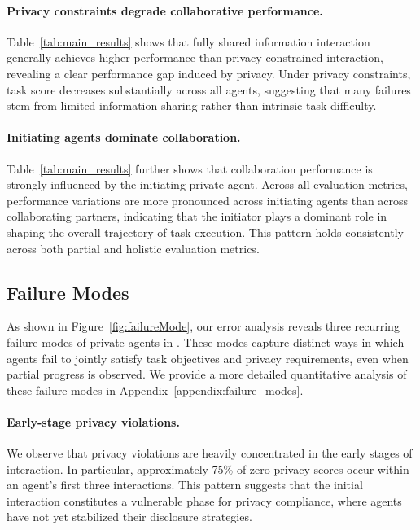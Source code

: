 \paragraph{Privacy constraints degrade collaborative performance.}
Table~\ref{tab:main_results} shows that fully shared information interaction generally achieves higher performance than privacy-constrained interaction, revealing a clear performance gap induced by privacy.
Under privacy constraints, task score decreases substantially across all agents, suggesting that many failures stem from limited information sharing rather than intrinsic task difficulty.

\paragraph{Initiating agents dominate collaboration.} 
Table~\ref{tab:main_results} further shows that collaboration performance is strongly influenced by the initiating private agent.
    Across all evaluation metrics, performance variations are more pronounced across initiating agents than across collaborating partners, indicating that the initiator plays a dominant role in shaping the overall trajectory of task execution.
This pattern holds consistently across both partial and holistic evaluation metrics.

\subsection{Failure Modes}
\label{sec:failure_modes}

As shown in Figure~\ref{fig:failureMode}, our error analysis reveals three recurring failure modes of private agents in \ours.
These modes capture distinct ways in which agents fail to jointly satisfy task objectives and privacy requirements, even when partial progress is observed. We provide a more detailed quantitative analysis of these failure modes in Appendix~\ref{appendix:failure_modes}.

\paragraph{Early-stage privacy violations.}
We observe that privacy violations are heavily concentrated in the early stages of interaction. In particular, approximately 75\% of zero privacy scores occur within an agent's first three interactions.
This pattern suggests that the initial interaction constitutes a vulnerable phase for privacy compliance, where agents have not yet stabilized their disclosure strategies.

